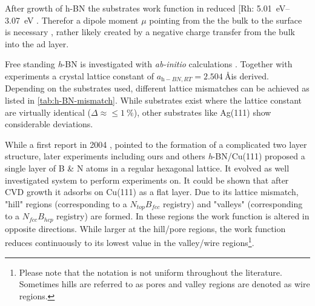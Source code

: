 After growth of h-BN the substrates work function in reduced [Rh: \SIrange{5.01}{3.07}{\eV} \cite{gomez_diaz_hexagonal_2013}. Therefor a dipole moment $\mu$ pointing from the the bulk to the surface is necessary \cite{roman_periodic_2013}, rather likely created by a negative charge transfer from the bulk into the ad layer.

Free standing \textit{h}-BN is investigated with \textit{ab-initio} calculations \cite{han_effects_2014,mortazavi_investigation_2012,topsakal_first-principles_2009,peng_mechanical_2012}. Together with experiments \cite{paszkowicz_lattice_2002} a crystal lattice constant of $a_{\textit{h}-BN, RT}=\SI{2.504}{\angstrom} $is derived. Depending on the substrates used, different lattice mismatches can be achieved as listed in \autoref{tab:h-BN-mismatch}. While substrates exist where the lattice constant are virtually identical ($\Delta \approx \leq \SI{1}{\percent}$), other substrates like Ag(111) show considerable deviations.

While a first report in 2004 \cite{corso_boron_2004}, pointed to the formation of a complicated two layer structure, later experiments \cite{roth_chemical_2013, li_grain_2015} including ours \cite{joshi_boron_2012, schwarz_corrugation_2017} and others  \textit{h}-BN/Cu(111) proposed a single layer of B \& N atoms in a regular hexagonal lattice. It evolved as well investigated system to perform experiments on. It could be shown that after CVD growth it adsorbs on Cu(111) as a flat layer. Due to its  lattice mismatch, "hill" regions  (corresponding to a $N_{top}B_{fcc}$ registry) and "valleys" (corresponding to a $N_{fcc}B_{hcp}$ registry) are formed. In these regions the work function is altered in opposite directions. While larger at the hill/pore regions, the work function reduces continuously to its lowest value in the valley/wire regions\footnote{Please note that the notation is not uniform throughout the literature. Sometimes hills are referred to as pores and valley regions are denoted as wire regions.}. 

